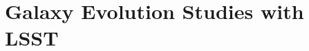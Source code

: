 
\chapter[Galaxy Evolution Studies with LSST]{Galaxy Evolution Studies with LSST}
\label{ch:science_background}


